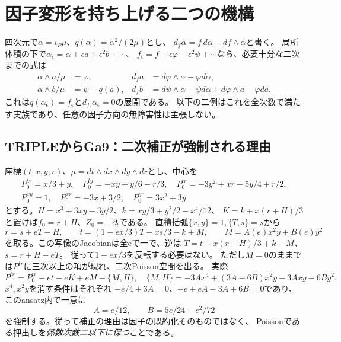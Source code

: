 \section{因子変形を持ち上げる二つの機構}\label{sec:moving-examples}
四次元で$\alpha=\iota_P\mu$、$q(\alpha)=\alpha^2/(2\mu)$とし、
$d_f\alpha=f\,d\alpha-df\wedge\alpha$と書く。
局所体積の下で$\alpha_\epsilon=\alpha+\epsilon a+\epsilon^2b+\cdots$、
$f_\epsilon=f+\epsilon\varphi+\epsilon^2\psi+\cdots$なら、必要十分な二次までの式は
\begin{align}
 \alpha\wedge a/\mu&=\varphi,&
 d_fa&=d\varphi\wedge\alpha-\varphi d\alpha,\label{eq:example-first}\\
 \alpha\wedge b/\mu&=\psi-q(a),&
 d_fb&=d\psi\wedge\alpha-\psi d\alpha
                  +d\varphi\wedge a-\varphi da.\label{eq:example-second}
\end{align}
これは$q(\alpha_\epsilon)=f_\epsilon$と$d_{f_\epsilon}\alpha_\epsilon=0$の展開である。
以下の二例はこれを全次数で満たす実族であり、任意の因子方向の無障害性は主張しない。

\subsection{TRIPLEからGa9：二次補正が強制される理由}
座標$(t,x,y,r)$、$\mu=dt\wedge dx\wedge dy\wedge dr$とし、中心を
\[
\begin{gathered}
 P_0^{tx}=x/3+y,\quad P_0^{ty}=-xy+y/6-r/3,\quad
 P_0^{tr}=-3y^2+xr-5y/4+r/2,\\
 P_0^{xy}=1,\quad P_0^{xr}=-3x+3/2,\quad P_0^{yr}=3x^2+3y
\end{gathered}
\]
とする。$H=x^3+3xy-3y/2$、$k=xy/3+y^2/2-x^4/12$、
$K=k+x(r+H)/3$と置けば$f_0=r+H$、$Z_0=-\partial_t$である。
直積括弧$\{x,y\}=1,\{T,s\}=s$から
\[
 r=s+eT-H,\qquad
 t=(1-ex/3)T-xs/3-k+M,\qquad M=A(e)x^2y+B(e)y^2
\]
を取る。この写像のJacobianは全eで一で、逆は
$T=t+x(r+H)/3+k-M$、$s=r+H-eT$。
従って$1-ex/3$を反転する必要はない。
ただし$M=0$のままでは$P^{tr}$に三次以上の項が現れ、二次Poisson空間を出る。
実際
\[
 P^{tr}=P_0^{tr}-et-eK+eM-\{M,H\},\quad
 \{M,H\}=-3Ax^4+(3A-6B)x^2y-3Axy-6By^2.
\]
$x^4,x^2y$を消す条件はそれぞれ
$-e/4+3A=0$、$-e+eA-3A+6B=0$であり、このansatz内で一意に
\[
 A=e/12,\qquad B=5e/24-e^2/72
\]
を強制する。従って補正の理由は因子の既約化そのものではなく、
Poissonである押出しを\emph{係数次数二以下に保つ}ことである。

